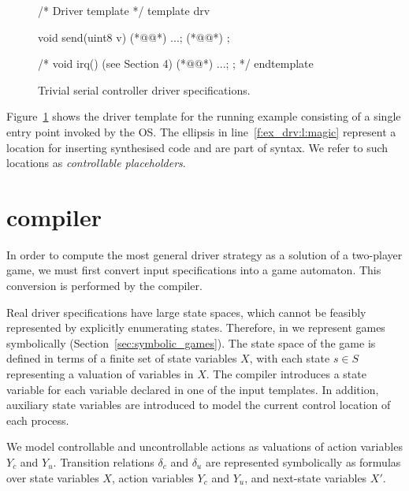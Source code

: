 \begin{figure}
\lstset{firstnumber=last}
\begin{tsllisting}[name=ex]
/* Driver template */
template drv 

    void send(uint8 v){ (*@\label{f:ex_drv:l:send}@*)
        ...; (*@\label{f:ex_drv:l:magic}@*)
    }; 

    /*
    void irq(){ (see Section 4) (*@\label{f:ex_drv:l:irq}@*)
        ...;
    }; 
    */
endtemplate
\end{tsllisting}
\caption{Trivial serial controller driver specifications.}
\label{f:ex_drv}
\end{figure}

Figure~\ref{f:ex_drv} shows the driver template for the running example consisting of a single  entry point invoked by the OS\@.  The ellipsis in line~\ref{f:ex_drv:l:magic} represent a location for inserting synthesised code and are part of \tsl syntax.  We refer to such locations as \emph{controllable placeholders}. 

\section{\tsl compiler}

In order to compute the most general driver strategy as a solution of a two-player game, we must first convert input \tsl specifications into a game automaton.  This conversion is performed by the \tsl compiler.

Real driver specifications have large state spaces, which cannot be feasibly represented by explicitly enumerating states.  Therefore, in \termite we represent games symbolically (Section~\ref{sec:symbolic_games}).  The state space of the game is defined in terms of a finite set of state variables $X$, with each state $s\in S$ representing a valuation of variables in $X$.  The \tsl compiler introduces a state variable for each \tsl variable declared in one of the input templates.  In addition, auxiliary state variables are introduced to model the current control location of each \tsl process.
        
We model controllable and uncontrollable actions as valuations of action variables $Y_c$ and $Y_u$.  Transition relations $\delta_c$ and $\delta_u$ are represented symbolically as formulas over state variables $X$, action variables $Y_c$ and $Y_u$, and next-state variables $X'$.  

